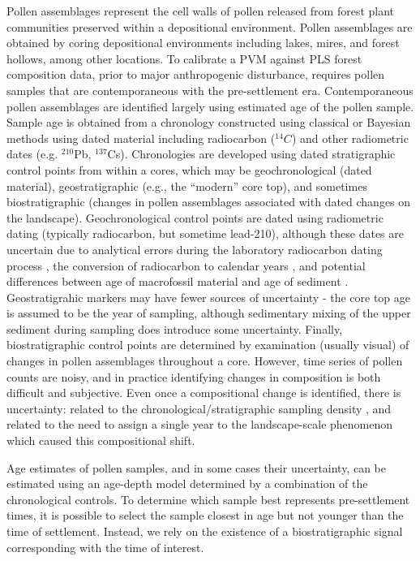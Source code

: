 \documentclass[12pt]{article}
\begin{document}
Pollen assemblages represent the cell walls of pollen released from
forest plant communities preserved within a depositional environment.
Pollen assemblages are obtained by coring depositional environments
including lakes, mires, and forest hollows, among other locations. To
calibrate a PVM against PLS forest composition data, prior to major
anthropogenic disturbance, requires pollen samples that are
contemporaneous with the pre-settlement era. Contemporaneous pollen
assemblages are identified largely using estimated age of the pollen
sample. Sample age is obtained from a chronology constructed using
classical \citep{blaauw2010methods} or Bayesian
\citep{blaauw2011flexible, buck1999bcal, blaauw2005radiocarbon,
  ramsey1995radiocarbon} methods using dated material including
radiocarbon (${}^{14}C$) and other radiometric dates (e.g. $^{210}$Pb,
$^137$Cs). Chronologies are developed using dated stratigraphic
control points from within a cores, which may be geochronological
(dated material), geostratigraphic (e.g., the ``modern'' core top),
and sometimes biostratigraphic (changes in pollen assemblages
associated with dated changes on the landscape). Geochronological
control points are dated using radiometric dating (typically
radiocarbon, but sometime lead-210), although these dates are
uncertain due to analytical errors during the laboratory radiocarbon
dating process \citep{ward1978procedures}, the conversion of
radiocarbon to calendar years \citep{reimer2013intcal13}, and
potential differences between age of macrofossil material and age of
sediment \citep{blois2011methodological}. Geostratigrahic markers may
have fewer sources of uncertainty - the core top age is assumed to be
the year of sampling, although sedimentary mixing of the upper
sediment during sampling does introduce some uncertainty. Finally,
biostratigraphic control points are determined by examination (usually
visual) of changes in pollen assemblages throughout a core. However,
time series of pollen counts are noisy, and in practice identifying
changes in composition is both difficult and subjective. Even once a
compositional change is identified, there is uncertainty: related to
the chronological/stratigraphic sampling density
\citep{liu2012temporal}, and related to the need to assign a single
year to the landscape-scale phenomenon which caused this compositional
shift.

Age estimates of pollen samples, and in some cases their uncertainty,
can be estimated using an age-depth model determined by a combination
of the chronological controls. To determine which sample best
represents pre-settlement times, it is possible to select the sample
closest in age but not younger than the time of settlement. Instead,
we rely on the existence of a biostratigraphic signal corresponding
with the time of interest.
\end{document}
